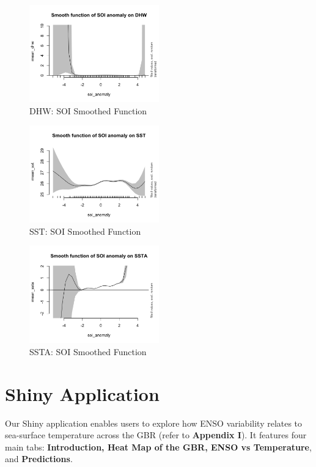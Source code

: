 \documentclass[letterpaper,9pt,twocolumn,twoside,]{pinp}
\begin{document}
\begin{figure}[H]
\centering
\includegraphics[width=0.5\textwidth]{report_images/dhw_soi.png}
\caption{DHW: SOI Smoothed Function}
\end{figure}

\begin{figure}[H]
\centering
\includegraphics[width=0.5\textwidth]{report_images/sst_soi.png}
\caption{SST: SOI Smoothed Function}
\end{figure}

\begin{figure}[H]
\centering
\includegraphics[width=0.5\textwidth]{report_images/ssta_soi.png}
\caption{SSTA: SOI Smoothed Function}
\end{figure}

\section{Shiny Application}\label{shiny-application}

Our Shiny application enables users to explore how ENSO variability
relates to sea-surface temperature across the GBR (refer to
\textbf{Appendix I}). It features four main tabs: \textbf{Introduction,
Heat Map of the GBR, ENSO vs Temperature}, and \textbf{Predictions}.
\end{document}
